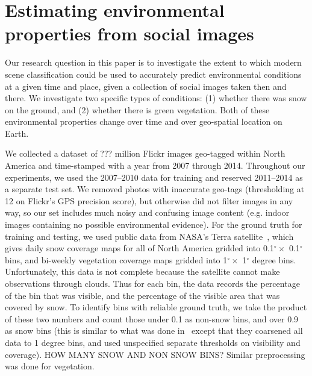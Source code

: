 \section{Estimating environmental properties from social images}

Our research question in this paper is to investigate the extent to
which modern scene classification could be used to accurately predict
environmental conditions at a given time and place, given a collection
of social images taken then and there. We investigate two specific
types of conditions: (1) whether there was snow on the ground, and (2)
whether there is green vegetation. Both of these environmental 
properties change over time and over geo-spatial location on Earth.


We collected a dataset of ??? million Flickr images
geo-tagged within North America and time-stamped with a year from 2007
through 2014. Throughout our experiments, we used the 2007--2010 data
for training and reserved 2011--2014 as a separate test set. We
removed photos with inaccurate geo-tags (thresholding at 12 on
Flickr's GPS precision score), but otherwise did not filter images in
any way, so our set includes much noisy and confusing image content
(e.g. indoor images containing no possible environmental evidence).
For the ground truth for training and testing, we used public data
from NASA's Terra satellite~\cite{terra}, which gives daily snow
coverage maps for all of North America gridded into 0.1$^\circ \times$
0.1$^\circ$ bins, and bi-weekly vegetation coverage maps gridded into
1$^\circ \times$ 1$^\circ$ degree bins. Unfortunately, this data is
not complete because the satellite cannot make observations through
clouds. Thus for each bin, the data records the percentage of the bin
that was visible, and the percentage of the visible area that was
covered by snow. To identify bins with reliable ground truth, we take
the product of these two numbers and count those under 0.1 as non-snow
bins, and over 0.9 as snow bins (this is similar to what was done
in~\cite{ecology2012www} except that they coarsened all data to 1
degree bins, and used unspecified separate thresholds on visibility and
coverage).  HOW MANY SNOW AND NON SNOW BINS? Similar preprocessing
was done for vegetation.


